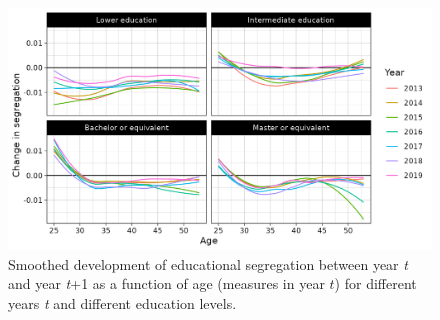 \documentclass[a4paper,12pt]{article}
\begin{document}
\begin{figure}
  \centering
  \includegraphics[width=\textwidth]{segregatie_ontwikkeling_leeftijd.png}
  \caption{Smoothed development of educational segregation between year \textit{t} and year \textit{t}+1 as a function of age (measures in year $t$) for different years \textit{t} and different education levels.}
  \label{fig:ontw}
\end{figure}
\end{document}
